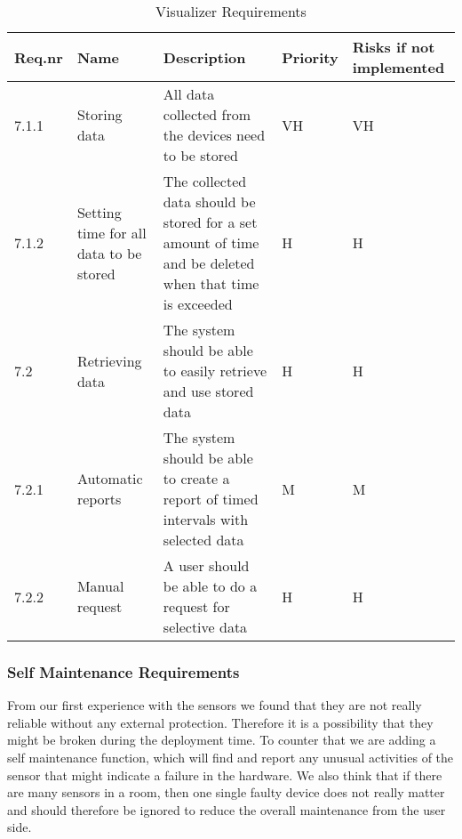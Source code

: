 \documentclass[../document]{subfiles}
\begin{document}
\begin{table}[H]
\caption{Visualizer Requirements}
\centering
\begin{tabularx}{\textwidth}{|l|X|X|l|X|}
	\hline
	Req.nr
	&Name
	&Description
	&Priority
	&Risks if not implemented
	\\ \hline 7.1.1
	&Storing data
	&All data collected from the devices need to be stored
	&VH
	&VH
	\\ \hline 7.1.2
	&Setting time for all data to be stored
	&The collected data should be stored for a set amount of time and be deleted when that time is exceeded
	&H
	&H
	\\ \hline 7.2
	&Retrieving data
	&The system should be able to easily retrieve and use stored data
	&H
	&H
	\\ \hline 7.2.1
	&Automatic reports
	&The system should be able to create a report of timed intervals with selected data
	&M
	&M
	\\ \hline 7.2.2
	&Manual request
	&A user should be able to do a request for selective data
	&H
	&H
	\\ \hline 
\end{tabularx}
\end{table}

\subsubsection{Self Maintenance Requirements}
From our first experience with the sensors we found that they are not really reliable without any external protection. Therefore it is a possibility that they might be broken during the deployment time. To counter that we are adding a self maintenance function, which will find and report any unusual activities of the sensor that might indicate a failure in the hardware. We also think that if there are many sensors in a room, then one single faulty device does not really matter and should therefore be ignored to reduce the overall maintenance from the user side.
\end{document}
